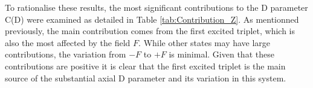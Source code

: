 \documentclass[12pt]{report}
\numberwithin{equation}{section}
\begin{document}
To rationalise these results, the most significant contributions to the D parameter C(D) were examined as detailed in Table \ref{tab:Contribution_Z}.
As mentionned previously, the main contribution comes from the first excited triplet, which is also the most affected by the field $F$.
While other states may have large contributions, the variation from $-F$ to $+F$ is minimal. 
Given that these contributions are positive it is clear that the first excited triplet is the main source of the substantial axial D parameter and its variation in this system.


\begin{table}[h]
    \centering
\end{table}
\end{document}
